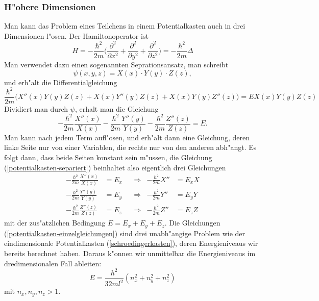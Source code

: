 \subsubsection{H"ohere Dimensionen}
Man kann das Problem eines Teilchens in einem Potentialkasten auch
in drei Dimensionen l"osen.
Der Hamiltonoperator ist 
\[
H=-\frac{\hbar^2}{2m}\biggl(
\frac{\partial^2}{\partial x^2}
+
\frac{\partial^2}{\partial y^2}
+
\frac{\partial^2}{\partial z^2}
\biggr)
=-\frac{\hbar^2}{2m}\Delta
\]
Man verwendet dazu einen sogenannten Seprationsansatz, man schreibt
\[
\psi(x,y,z)=X(x)\cdot Y(y)\cdot Z(z),
\]
und erh"alt die Differentialgleichung
\[
\frac{\hbar^2}{2m}\biggl(
X''(x)Y(y)Z(z)
+
X(x)Y''(y)Z(z)
+
X(x)Y(y)Z''(z)
\biggr)
=
EX(x)Y(y)Z(z)
\]
Dividiert man durch $\psi$, erhalt man die Gleichung
\begin{equation}
-\frac{\hbar^2}{2m}\frac{X''(x)}{X(x)}
-
\frac{\hbar^2}{2m}\frac{Y''(y)}{Y(y)}
-
\frac{\hbar^2}{2m}\frac{Z''(z)}{Z(z)}
=
E.
\label{potentialkasten-separiert}
\end{equation}
Man kann nach jedem Term aufl"osen, und erh"alt dann eine Gleichung,
deren linke Seite nur von einer Variablen, die rechte nur von den anderen
abh"angt.
Es folgt dann, dass beide Seiten konstant sein m"ussen, 
die Gleichung (\ref{potentialkasten-separiert}) beinhaltet also eigentlich
drei Gleichungen
\begin{equation}
\begin{aligned}
-\frac{\hbar^2}{2m}\frac{X''(x)}{X(x)}&=E_x&&\Rightarrow&-\frac{\hbar^2}{2m}X''&=E_xX\\
-\frac{\hbar^2}{2m}\frac{Y''(y)}{Y(y)}&=E_y&&\Rightarrow&-\frac{\hbar^2}{2m}Y''&=E_yY\\
-\frac{\hbar^2}{2m}\frac{Z''(z)}{Z(z)}&=E_z&&\Rightarrow&-\frac{\hbar^2}{2m}Z''&=E_zZ
\end{aligned}
\label{potentialkasten-einzelgleichungen}
\end{equation}
mit der zus"atzlichen Bedingung $E=E_x+E_y+E_z$.
Die Gleichungen (\ref{potentialkasten-einzelgleichungen}) sind drei
unabh"angige Problem wie der eindimensionale Potentialkasten
(\ref{schroedingerkasten}), deren Energieniveaus wir bereits berechnet
haben.
Daraus k"onnen wir unmittelbar die Energieniveaus im dredimensionalen
Fall ableiten:
\[
E=\frac{h^2}{32ml^2}(n_x^2+n_y^2+n_z^2)
\]
mit $n_x,n_y,n_z>1$.

